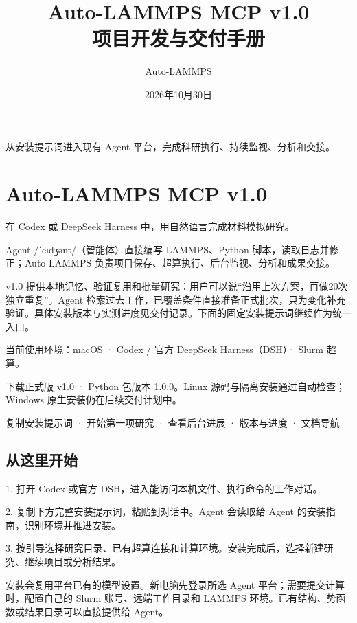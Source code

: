 \documentclass[11pt,a4paper]{ctexart}
\begin{document}
\title{Auto-LAMMPS MCP v1.0\\项目开发与交付手册}
\author{Auto-LAMMPS}
\date{2026年10月30日}
\maketitle
从安装提示词进入现有 Agent 平台，完成科研执行、持续监视、分析和交接。
\tableofcontents
\clearpage
\section{Auto-LAMMPS MCP v1.0}


在 Codex 或 DeepSeek Harness 中，用自然语言完成材料模拟研究。



Agent /\allowbreak{}ˈeɪdʒənt/\allowbreak{}（智能体）直接编写 LAMMPS、Python 脚本，读取日志并修正；Auto-LAMMPS 负责项目保存、超算执行、后台监视、分析和成果交接。



v1.0 提供本地记忆、验证复用和批量研究：用户可以说“沿用上次方案，再做20次独立重复”。Agent 检索过去工作，已覆盖条件直接准备正式批次，只为变化补充验证。具体安装版本与实测进度见交付记录。下面的固定安装提示词继续作为统一入口。



当前使用环境：macOS · Codex /\allowbreak{} 官方 DeepSeek Harness（DSH）· Slurm 超算。



下载正式版 v1.0 · Python 包版本 1.0.0。Linux 源码与隔离安装通过自动检查；Windows 原生安装仍在后续交付计划中。



复制安装提示词 · 开始第一项研究 · 查看后台进展 · 版本与进度 · 文档导航



\subsection{从这里开始}


1. 打开 Codex 或官方 DSH，进入能访问本机文件、执行命令的工作对话。

2. 复制下方完整安装提示词，粘贴到对话中。Agent 会读取给 Agent 的安装指南，识别环境并推进安装。

3. 按引导选择研究目录、已有超算连接和计算环境。安装完成后，选择新建研究、继续项目或分析结果。



安装会复用平台已有的模型设置。新电脑先登录所选 Agent 平台；需要提交计算时，配置自己的 Slurm 账号、远端工作目录和 LAMMPS 环境。已有结构、势函数或结果目录可以直接提供给 Agent。
\end{document}
